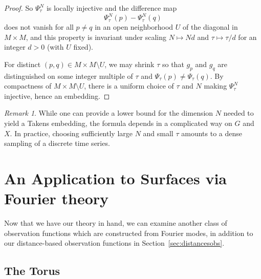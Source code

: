 \documentclass[11pt]{article}
\newcommand{\AliceEdit}[1]{\textcolor{green}{(#1)}}
\theoremstyle{definition}
\theoremstyle{remark}
\newtheorem{remark}[theorem]{Remark}
\begin{document}
\begin{proof}
    So $\Psi_\tau^N$ is locally injective and the difference map
    \[\Psi_\tau^N(p) - \Psi_\tau^N(q)\]
    does not vanish for all $p\neq q$ in an open neighborhood $U$ of the diagonal in $M\times M$, and this property is invariant under scaling $N\mapsto Nd$ and $\tau\mapsto \tau/d$ for an integer $d>0$ (with $U$ fixed).

    For distinct $(p, q)\in M\times M\setminus U$, we may shrink $\tau$ so that $g_p$ and $g_q$ are distinguished on some integer multiple of $\tau$ and $\Psi_\tau(p) \neq \Psi_\tau(q)$. By compactness of $M\times M\setminus U$, there is a uniform choice of $\tau$ and $N$ making $\Psi_\tau^N$ injective, hence an embedding.

    \end{proof}

    \begin{remark}
    While one can provide a lower bound for the dimension $N$ needed to yield a Takens embedding, the formula depends in a complicated way on $G$ and $X$. In practice, choosing sufficiently large $N$ and small $\tau$ amounts to a dense sampling of a discrete time series.
    \end{remark}
    

    \section{An Application to Surfaces via Fourier theory}
    \label{sec:fourier}

    Now that we have our theory in hand, we can examine another class of observation functions which are constructed from Fourier modes, in addition to our distance-based observation functions in Section~\ref{sec:distancesobs}.

    \subsection{The Torus}


\end{document}
